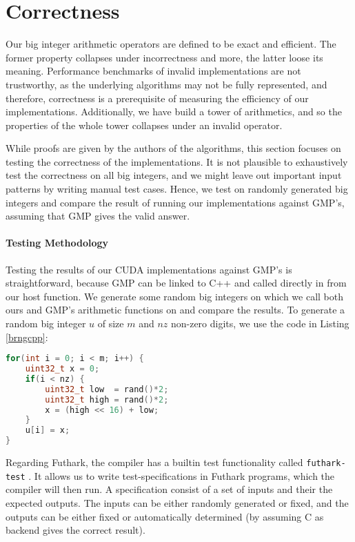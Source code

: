 \section{Correctness}
\label{sec:cor}

Our big integer arithmetic operators are defined to be exact and efficient. The
former property collapses under incorrectness and more, the latter loose its
meaning. Performance benchmarks of invalid implementations are not trustworthy,
as the underlying algorithms may not be fully represented, and therefore,
correctness is a prerequisite of measuring the efficiency of our
implementations. Additionally, we have build a tower of arithmetics, and so the
properties of the whole tower collapses under an invalid operator.

While proofs are given by the authors of the algorithms, this section focuses on
testing the correctness of the implementations. It is not plausible to
exhaustively test the correctness on all big integers, and we might leave out
important input patterns by writing manual test cases. Hence, we test on
randomly generated big integers and compare the result of running our
implementations against GMP's, assuming that GMP gives the valid answer.

\paragraph{Testing Methodology}
Testing the results of our CUDA implementations against GMP's is
straightforward, because GMP can be linked to C++ and called directly in from
our host function. We generate some random big integers on which we call both
ours and GMP's arithmetic functions on and compare the results. To generate a
random big integer $u$ of size $m$ and $\mathit{nz}$ non-zero digits, we use the
code in Listing \ref{brngcpp}:
\begin{lstlisting}[language=CPP, caption={\footnotesize Random big integer generator in C++ with $u$ of size $m$ and $nz$ non-zero digits.}, label={brngcpp}]
for(int i = 0; i < m; i++) {
    uint32_t x = 0;
    if(i < nz) {
        uint32_t low  = rand()*2;
        uint32_t high = rand()*2;
        x = (high << 16) + low;
    }
    u[i] = x;
}
\end{lstlisting}

Regarding Futhark, the compiler has a builtin test functionality called
\texttt{futhark-test} \cite{futguide}. It allows us to write test-specifications
in Futhark programs, which the compiler will then run. A specification consist
of a set of inputs and their the expected outputs. The inputs can be either
randomly generated or fixed, and the outputs can be either fixed or
automatically determined (by assuming C as backend gives the correct result).

